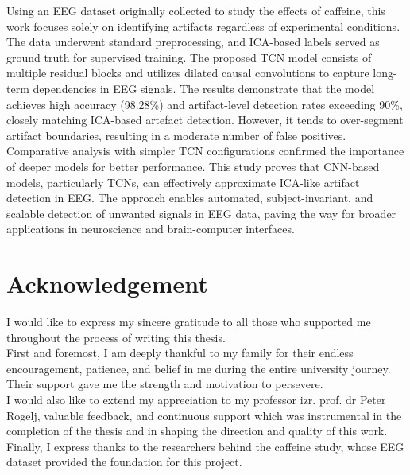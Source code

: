 \documentclass[12pt,a4paper,titlepage,openany]{report}
\begin{document}
\begin{center}
{{Using an EEG dataset originally collected to study the effects of caffeine, this work focuses solely on identifying artifacts regardless of experimental conditions. The data underwent standard preprocessing, and ICA-based labels served as ground truth for supervised training. The proposed TCN model consists of multiple residual blocks and utilizes dilated causal convolutions to capture long-term dependencies in EEG signals.
The results demonstrate that the model achieves high accuracy (98.28\%) and artifact-level detection rates exceeding 90\%, closely matching ICA-based artefact detection. However, it tends to over-segment artifact boundaries, resulting in a moderate number of false positives. Comparative analysis with simpler TCN configurations confirmed the importance of deeper models for better performance.
This study proves that CNN-based models, particularly TCNs, can effectively approximate ICA-like artifact detection in EEG. The approach enables automated, subject-invariant, and scalable detection of unwanted signals in EEG data, paving the way for broader applications in neuroscience and brain-computer interfaces.
\vspace{0.2cm}
}}
\end{center}





\newpage
\section*{Acknowledgement}
I would like to express my sincere gratitude to all those who supported me throughout the process of writing this thesis.\\
First and foremost, I am deeply thankful to my family for their endless encouragement, patience, and belief in me during the entire university journey. Their support gave me the strength and motivation to persevere.\\
I would also like to extend my appreciation to my professor izr. prof. dr Peter Rogelj, valuable feedback, and continuous support which was instrumental in the completion of the thesis and in shaping the direction and quality of this work.\\
Finally, I express thanks to the researchers behind the caffeine study, whose EEG dataset provided the foundation for this project.

\newpage
\end{document}
